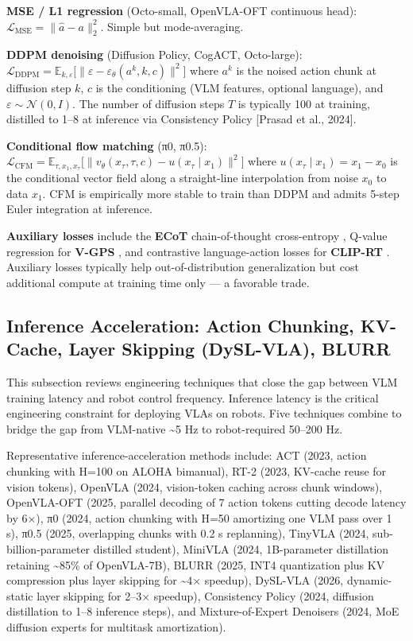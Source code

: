 \documentclass{article}
\begin{document}
\textbf{MSE / L1 regression} (Octo-small, OpenVLA-OFT continuous head): \(\mathcal{L}_{\text{MSE}} = \|\hat{a} - a\|_2^2\). Simple but mode-averaging.

\textbf{DDPM denoising} (Diffusion Policy, CogACT, Octo-large): \(\mathcal{L}_{\text{DDPM}} = \mathbb{E}_{k, \varepsilon}\big[\|\varepsilon - \varepsilon_\theta(a^k, k, c)\|^2\big]\) where \(a^k\) is the noised action chunk at diffusion step \(k\), \(c\) is the conditioning (VLM features, optional language), and \(\varepsilon \sim \mathcal{N}(0, I)\). The number of diffusion steps \(T\) is typically 100 at training, distilled to 1--8 at inference via Consistency Policy {[}Prasad et al., 2024{]}.

\textbf{Conditional flow matching} (π0, π0.5): \(\mathcal{L}_{\text{CFM}} = \mathbb{E}_{\tau, x_1, x_\tau}\big[\|v_\theta(x_\tau, \tau, c) - u(x_\tau \mid x_1)\|^2\big]\) where \(u(x_\tau \mid x_1) = x_1 - x_0\) is the conditional vector field along a straight-line interpolation from noise \(x_0\) to data \(x_1\). CFM is empirically more stable to train than DDPM and admits 5-step Euler integration at inference.

\textbf{Auxiliary losses} include the \textbf{ECoT} chain-of-thought cross-entropy \citep{zawalski2024roboticcontrolviae}, Q-value regression for \textbf{V-GPS} \cite{nakamoto2024steeringyourgenera}, and contrastive language-action losses for \textbf{CLIP-RT} \cite{kang2025cliprtlearninglang}. Auxiliary losses typically help out-of-distribution generalization but cost additional compute at training time only --- a favorable trade.

\subsection{Inference Acceleration: Action Chunking, KV-Cache, Layer Skipping (DySL-VLA), BLURR}\label{inference-acceleration-action-chunking-kv-cache-layer-skipping-dysl-vla-blurr}

This subsection reviews engineering techniques that close the gap between VLM training latency and robot control frequency. Inference latency is the critical engineering constraint for deploying VLAs on robots. Five techniques combine to bridge the gap from VLM-native \textasciitilde5 Hz to robot-required 50--200 Hz.

Representative inference-acceleration methods include: ACT (2023, action chunking with H=100 on ALOHA bimanual), RT-2 (2023, KV-cache reuse for vision tokens), OpenVLA (2024, vision-token caching across chunk windows), OpenVLA-OFT (2025, parallel decoding of 7 action tokens cutting decode latency by 6×), π0 (2024, action chunking with H=50 amortizing one VLM pass over 1 s), π0.5 (2025, overlapping chunks with 0.2 s replanning), TinyVLA (2024, sub-billion-parameter distilled student), MiniVLA (2024, 1B-parameter distillation retaining \textasciitilde85\% of OpenVLA-7B), BLURR (2025, INT4 quantization plus KV compression plus layer skipping for \textasciitilde4× speedup), DySL-VLA (2026, dynamic-static layer skipping for 2--3× speedup), Consistency Policy (2024, diffusion distillation to 1--8 inference steps), and Mixture-of-Expert Denoisers (2024, MoE diffusion experts for multitask amortization).
\end{document}

